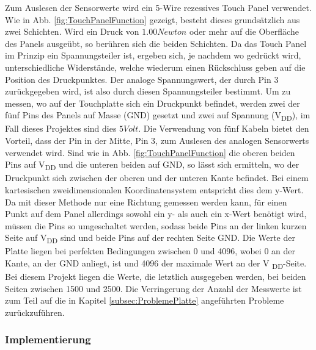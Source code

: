 \documentclass[12pt,a4paper,bibliography=totoc,listof=totoc]{scrartcl}
\begin{document}
Zum Auslesen der Sensorwerte wird ein 5-Wire rezessives Touch Panel verwendet.\newline
Wie in Abb. \ref{fig:TouchPanelFunction} gezeigt, besteht dieses grundsätzlich aus zwei Schichten. Wird ein Druck von $1.00 Newton$ oder mehr auf die Oberfläche des Panels ausgeübt, so berühren sich die beiden Schichten. Da das Touch Panel im Prinzip ein Spannungsteiler ist, ergeben sich, je nachdem wo gedrückt wird, unterschiedliche Widerstände, welche wiederum einen Rückschluss geben auf die Position des Druckpunktes. Der analoge Spannungswert, der durch Pin 3 zurückgegeben wird, ist also durch diesen Spannungsteiler bestimmt.\newline
Um zu messen, wo auf der Touchplatte sich ein Druckpunkt befindet, werden zwei der fünf Pins des Panels auf Masse (GND) gesetzt und zwei auf Spannung (V\textsubscript{DD}), im Fall dieses Projektes sind dies $5 Volt$. Die Verwendung von fünf Kabeln bietet den Vorteil, dass der Pin in der Mitte, Pin 3, zum Auslesen des analogen Sensorwerts verwendet wird.
Sind wie in Abb. \ref{fig:TouchPanelFunction} die oberen beiden Pins auf V\textsubscript{DD} und die unteren beiden auf GND, so lässt sich ermitteln, wo der Druckpunkt sich zwischen der oberen und der unteren Kante befindet. Bei einem kartesischen zweidimensionalen Koordinatensystem entspricht dies dem y-Wert.
Da mit dieser Methode nur eine Richtung gemessen werden kann, für einen Punkt auf dem Panel allerdings sowohl ein y- als auch ein x-Wert benötigt wird, müssen die Pins so umgeschaltet werden, sodass beide Pins an der linken kurzen Seite auf V\textsubscript{DD} sind und beide Pins auf der rechten Seite GND.\newline
Die Werte der Platte liegen bei perfekten Bedingungen zwischen  0 und 4096, wobei 0 an der Kante, an der GND anliegt, ist und 4096 der maximale Wert an der V \textsubscript{DD}-Seite. Bei diesem Projekt liegen die Werte, die letztlich ausgegeben werden, bei beiden Seiten zwischen 1500 und 2500. Die Verringerung der Anzahl der Messwerte ist zum Teil auf die in Kapitel \ref{subsec:ProblemePlatte} angeführten Probleme zurückzuführen.

\subsubsection{Implementierung}
\end{document}
